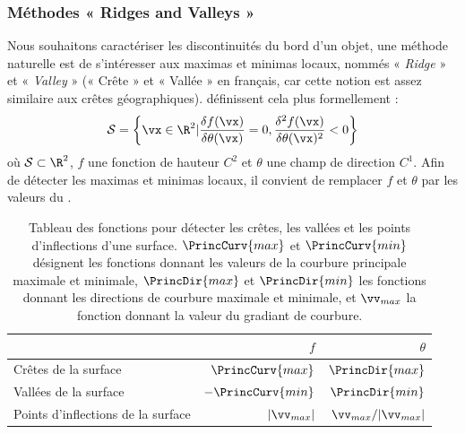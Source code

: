 \subsubsection{Méthodes « Ridges and Valleys »}%
\label{sec:applications:feature:ridge}
%
Nous souhaitons caractériser les discontinuités du bord d'un objet, une méthode
naturelle est de s'intéresser aux maximas et minimas locaux, nommés \respp «
\emph{Ridge} » et « \emph{Valley} » (« Crête » et « Vallée » en français, car
cette notion est assez similaire aux crêtes géographiques).
%
 définissent cela plus formellement :
%
\begin{equation}
  \mathcal{S} = \left\{ \vx \in \R^2 |
  \frac{\delta f(\vx)}{\delta \theta(\vx)} = 0,
  \frac{\delta^2 f(\vx)}{\delta \theta(\vx)^2} < 0 \right\}
\end{equation}
%
où $\mathcal{S} \subset \R^2$, $f$ une fonction de hauteur $C^2$ et $\theta$ une
champ de direction $C^1$. Afin de détecter les maximas et minimas locaux, il
convient de remplacer $f$ et $\theta$ par les valeurs du
.
%
\begin{table}[h]
  \begin{center}
    \caption[Tableau des fonctions pour détecter les crêtes, les vallées et les
    points d'inflections d'une surface.]{Tableau des fonctions pour détecter les
    crêtes, les vallées et les points d'inflections d'une surface.
    $\PrincCurv{max}$ et $\PrincCurv{min}$ désignent les fonctions donnant les
    valeurs de la courbure principale maximale et minimale, $\PrincDir{max}$ et
    $\PrincDir{min}$ les fonctions donnant les directions de courbure maximale
    et minimale, et $\vv_{max}$ la fonction donnant la valeur du gradiant de
    courbure.}
    \label{tab:ridges-valleys-fonctions}
    \begin{tabular}{@{}lrr@{}}
      \toprule
                                          & $f$                 & $\theta$                \\ \midrule
      Crêtes de la surface                & $\PrincCurv{max}$   & $\PrincDir{max}$        \\
      Vallées de la surface               & $-\PrincCurv{min}$  & $\PrincDir{min}$        \\
      Points d'inflections de la surface  & $|\vv_{max}|$       & $\vv_{max}/|\vv_{max}|$ \\ \bottomrule
    \end{tabular}
  \end{center}
\end{table}

